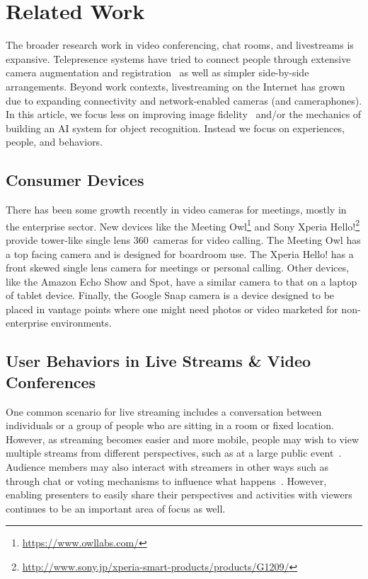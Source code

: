 \documentclass{tufte-handout}
\begin{document}
\section{Related Work}
The broader research work in video conferencing, chat rooms, and
livestreams is expansive.  Telepresence systems have tried to connect
people through extensive camera augmentation and
registration~\cite{Dunnigan:2015:ETT:2733373.2807400} as well as
simpler side-by-side~\cite{Tanner:2010:IRC:1753846.1754007}
arrangements.  Beyond work contexts, livestreaming on the Internet has
grown~\cite{Lottridge:2017:TLT:3098279.3098540} due to expanding
connectivity and network-enabled cameras (and cameraphones). In this
article, we focus less on improving image
fidelity~\cite{Wang:2016:APL:2987443.2987453} and/or the mechanics of
building an AI system for object recognition. Instead we focus on
experiences, people, and behaviors.

\subsection{Consumer Devices}
There has been some growth recently in video cameras for meetings,
mostly in the enterprise sector. New devices like the Meeting
Owl\footnote{\url{https://www.owllabs.com/}} and Sony Xperia
Hello!\footnote{\url{http://www.sony.jp/xperia-smart-products/products/G1209/}}
provide tower-like single lens 360\textdegree\ cameras for video
calling.  The Meeting Owl has a top facing camera and is designed for
boardroom use.  The Xperia Hello! has a front skewed single lens
camera for meetings or personal calling. Other devices, like the
Amazon Echo Show and Spot, have a similar camera to that on a laptop
of tablet device. Finally, the Google Snap camera is a device designed
to be placed in vantage points where one might need photos or video
marketed for non-enterprise environments.

\subsection{User Behaviors in Live Streams \& Video Conferences}
One common scenario for live streaming includes a conversation between
individuals or a group of people who are sitting in a room or fixed
location. However, as streaming becomes easier and more mobile, people
may wish to view multiple streams from different perspectives, such as
at a large public event~\cite{hamilton2016rivulet}.  Audience members
may also interact with streamers in other ways such as through chat or
voting mechanisms to influence what
happens~\cite{lessel2017let}. However, enabling presenters to easily
share their perspectives and activities with viewers continues to be
an important area of focus as well.
\end{document}
